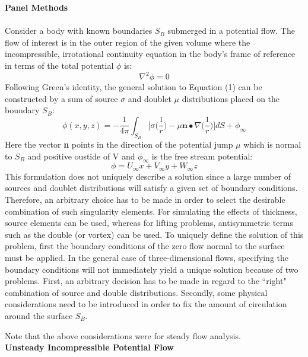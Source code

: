 \documentclass{article}
\begin{document}
\noindent\textbf{Panel Methods}\\ \\
Consider a body with known boundaries $S_B$ submerged in a potential flow. The flow of interest is in the outer region of the given volume where the incompressible, irrotational continuity equation in the body's frame of reference in terms of the total potential $\phi$ is: \\
\begin{equation}
\nabla^2 \phi = 0
\end{equation}
Following Green's identity, the general solution to Equation (1) can be constructed by a sum of source $\sigma$ and doublet $\mu$ distributions placed on the boundary $S_B$:\\
\begin{equation}
\phi(x,y,z) = - \frac{1}{4\pi} \int_{S_B} \Bigg[ \sigma \Bigg( \frac{1}{r} \Bigg)- \mu \textbf{n} \bullet \nabla \Bigg( \frac{1}{r} \Bigg) \Bigg] dS + \phi_{\infty}
\end{equation}
Here the vector \textbf{n} points in the direction of the potential jump $\mu$ which is normal to $S_B$ and positive oustide of V and $\phi_{\infty}$ is the free stream potential:
\begin{equation}
\phi = U_{\infty} x + V_{\infty} y + W_{\infty} z
\end{equation}
This formulation does not uniquely describe a solution since a large number of sources and doublet distributions will satisfy a given set of boundary conditions. Therefore, an arbitrary choice has to be made in order to select the desirable combination of such singularity elements. For simulating the effects of thickness, source elements can be used, whereas for lifting problems, antisymmetric terms such as the double (or vortex) can be used. To uniquely define the solution of this problem, first the boundary conditions of the zero flow normal to the surface must be applied. In the general case of three-dimensional flows, specifying the boundary conditions will not immediately yield a unique solution because of two problems. First, an arbitrary decision has to be made in regard to the ``right" combination of source and double distributions. Secondly, some physical considerations need to be introduced in order to fix the amount of circulation around the surface $S_B$. 

\noindent Note that the above considerations were for steady flow analysis. \\

\noindent \textbf{Unsteady Incompressible Potential Flow} \\
\end{document}
